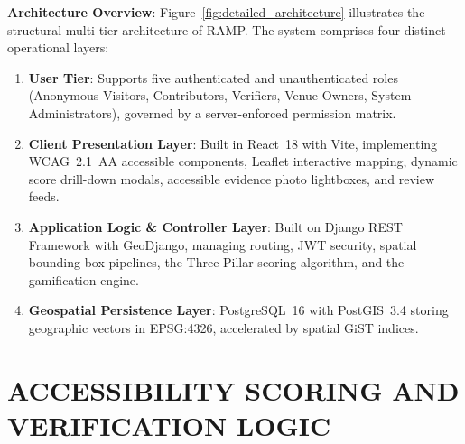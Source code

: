 \documentclass[12pt,a4paper]{report}
\begin{document}
\noindent \textbf{Architecture Overview}: Figure~\ref{fig:detailed_architecture} illustrates the structural multi-tier architecture of RAMP. The system comprises four distinct operational layers:
\begin{enumerate}
    \item \textbf{User Tier}: Supports five authenticated and unauthenticated roles (Anonymous Visitors, Contributors, Verifiers, Venue Owners, System Administrators), governed by a server-enforced permission matrix.
    \item \textbf{Client Presentation Layer}: Built in React~18 with Vite, implementing WCAG~2.1~AA accessible components, Leaflet interactive mapping, dynamic score drill-down modals, accessible evidence photo lightboxes, and review feeds.
    \item \textbf{Application Logic \& Controller Layer}: Built on Django REST Framework with GeoDjango, managing routing, JWT security, spatial bounding-box pipelines, the Three-Pillar scoring algorithm, and the gamification engine.
    \item \textbf{Geospatial Persistence Layer}: PostgreSQL~16 with PostGIS~3.4 storing geographic vectors in EPSG:4326, accelerated by spatial GiST indices.
\end{enumerate}

\section{ACCESSIBILITY SCORING AND VERIFICATION LOGIC}
\end{document}
